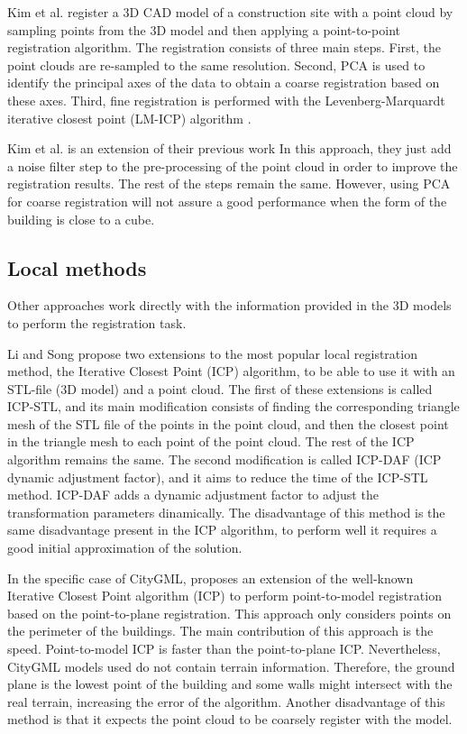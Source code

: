         Kim et al. \cite{Kim_2011_fully} register a 3D CAD model of a construction site with a point cloud by sampling points from the 3D model 
        and then applying a point-to-point registration algorithm. The registration consists of three main steps. First, 
        the point clouds are re-sampled to the same resolution. Second, PCA is used to identify the principal axes of the data 
        to obtain a coarse registration based on these axes. Third, fine registration is performed with the Levenberg-Marquardt
        iterative closest point (LM-ICP) algorithm \cite{Fitzgibbon_2003_robust}. 
        
        Kim et al. \cite{Kim_2013_fully} is an extension of their previous work \cite{Kim_2011_fully}
        In this approach, they just add a noise filter step to the pre-processing of the point cloud in order to improve the registration results.
        The rest of the steps remain the same.
        However, using PCA for coarse registration will not assure a good performance when the form of the building is close to a cube.
        
        \subsection{Local methods}

        Other approaches work directly with the information provided in the 3D models to perform the registration task.

        Li and Song \cite{Li_2015_amodified} propose two extensions to the most popular local registration method, the Iterative Closest Point (ICP) algorithm, 
        to be able to use it with an STL-file (3D model) and a point cloud.
        The first of these extensions is called ICP-STL, and its main modification consists of finding the corresponding triangle mesh of the STL file of the points 
        in the point cloud, and then the closest point in the triangle mesh to each point of the point cloud. The rest of the ICP algorithm remains the same.
        The second modification is called ICP-DAF (ICP dynamic adjustment factor), and it aims to reduce the time of the ICP-STL method. 
        ICP-DAF adds a dynamic adjustment factor to adjust the transformation parameters dinamically.
        The disadvantage of this method is the same disadvantage present in the ICP algorithm, to perform well it requires a good initial approximation of the solution.

        In the specific case of CityGML, \cite{Goebbels_2019_icpcitygml} proposes an extension of the well-known Iterative Closest Point algorithm (ICP) 
        to perform point-to-model registration based on the point-to-plane registration.
        This approach only considers points on the perimeter of the buildings.
        The main contribution of this approach is the speed. Point-to-model ICP is faster than the point-to-plane ICP.
        Nevertheless, CityGML models used do not contain terrain information. 
        Therefore, the ground plane is the lowest point of the building and some walls might intersect with the real terrain, increasing the error of the algorithm.
        Another disadvantage of this method is that it expects the point cloud to be coarsely register with the model.

